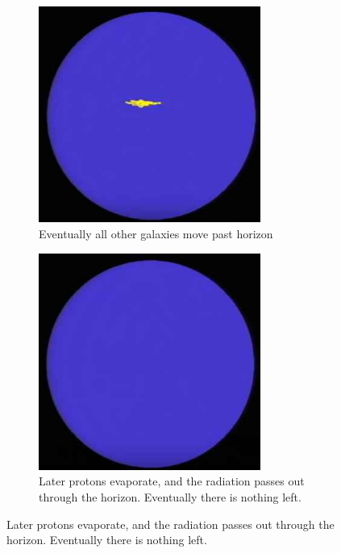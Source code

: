 \documentclass[]{article}
\begin{document}
\begin{figure}[H]
\begin{center}
\begin{subfigure}[t]{0.45\textwidth}
		\end{subfigure}
		\begin{subfigure}[t]{0.45\textwidth}
			\caption{Eventually all other galaxies move past horizon}\label{fig:wt1ws-eventually}
			\includegraphics[width=0.8\textwidth]{wt1ws-eventually}
		\end{subfigure}
		\begin{subfigure}[t]{0.45\textwidth}
			\caption{Later protons evaporate, and the radiation passes out through the horizon. Eventually there is nothing left.}\label{fig:wt1ws-even-more-eventually}
			\includegraphics[width=0.8\textwidth]{wt1ws-even-more-eventually}
		\end{subfigure}

\end{center}
\end{figure}
\end{document}

